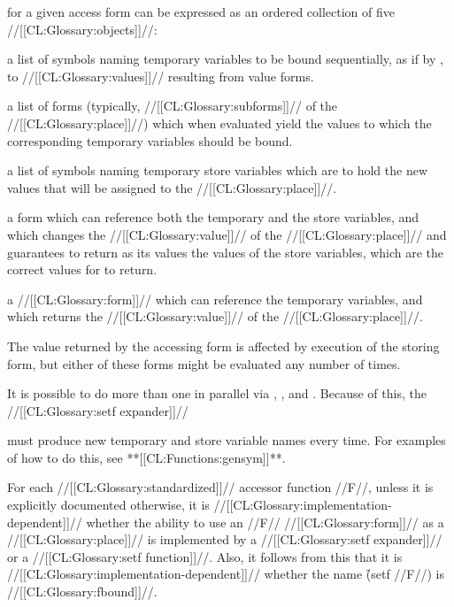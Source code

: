 for a given access form can be expressed as an ordered collection of five //[[CL:Glossary:objects]]//:

\beginlist


a list of symbols naming temporary variables to be bound sequentially, as if by , to //[[CL:Glossary:values]]//  resulting from value forms.

a list of forms (typically, //[[CL:Glossary:subforms]]// of the //[[CL:Glossary:place]]//) which when evaluated  yield the values to which the corresponding temporary  variables should be bound.


a list of symbols naming temporary store variables which are to hold the new values that will be assigned to the //[[CL:Glossary:place]]//.


a form which can reference both the temporary and the store variables, and which changes the //[[CL:Glossary:value]]// of the //[[CL:Glossary:place]]// and guarantees to return as its values the values of the store variables, which are the correct values for  to return.


a //[[CL:Glossary:form]]// which can reference the temporary variables, and which returns the //[[CL:Glossary:value]]// of the //[[CL:Glossary:place]]//. \endlist

The value returned by the accessing form is affected by execution of the storing form, but either of these forms might be evaluated any number of times.

It is possible to do more than one  in parallel via , , and .   Because of this, the   //[[CL:Glossary:setf expander]]//

must produce new temporary  and store variable names every time.  For examples of how to do this, see **[[CL:Functions:gensym]]**.

 For each //[[CL:Glossary:standardized]]// accessor function //F//, unless it is explicitly documented otherwise, it is //[[CL:Glossary:implementation-dependent]]// whether the ability to  use an //F// //[[CL:Glossary:form]]// as a  //[[CL:Glossary:place]]// is implemented by a //[[CL:Glossary:setf expander]]// or a //[[CL:Glossary:setf function]]//. Also, it follows from this that it is //[[CL:Glossary:implementation-dependent]]//  whether the name \f{(setf //F//)} is //[[CL:Glossary:fbound]]//.

